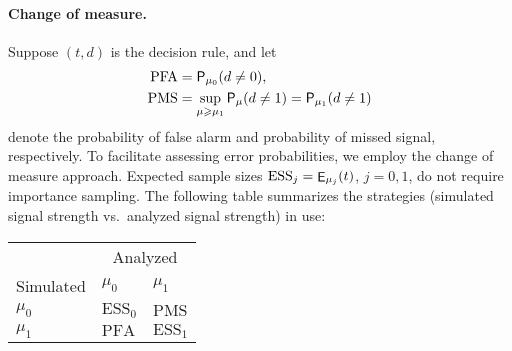 \documentclass{article}
\renewcommand{\geq}{\geqslant}
\renewcommand{\Pr}{{\sf P}}           %
\DeclareMathOperator{\EV}{{\sf E}}    %
\newcommand{\ESS}{\mathrm{ESS}}
\newcommand{\PFA}{\mathrm{PFA}}
\newcommand{\PMS}{\mathrm{PMS}}
\begin{document}
\paragraph*{Change of measure.}
Suppose $(t, d)$ is the decision rule, and let
\begin{align*}
    \PFA &= \Pr_{\mu_0} (d \neq 0), \\
    \PMS &= \sup_{\mu \geq \mu_1} \Pr_{\mu} (d \neq 1) = \Pr_{\mu_1} (d \neq 1)
\end{align*}
denote the probability of false alarm and probability of missed signal, respectively.
To facilitate assessing error probabilities, we employ the change of measure approach. Expected sample sizes $\ESS_j = \EV_{\mu_j}(t)$, $j = 0, 1$, do not require importance sampling. The following table summarizes the strategies (simulated signal strength vs.\ analyzed signal strength) in use:
\begin{center}
    \begin{tabular}{@{} l l l @{}} \toprule
                  & \multicolumn{2}{c}{Analyzed} \\ \cmidrule{2-3}
        Simulated & $\mu_0$           & $\mu_1$         \\ \midrule
        $\mu_0$   & $\ESS_0$          & $\PMS $         \\
        $\mu_1$   & $\PFA $           & $\ESS_1$        \\ \bottomrule
    \end{tabular}
\end{center}
\end{document}
